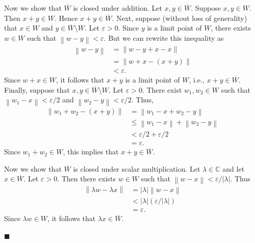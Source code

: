 \documentclass[12pt]{article}
\newcommand\norm[1]{\left\lVert#1\right\rVert}
\begin{document}
\vspace{3mm}

\noindent Now we show that $\overline{W}$ is closed under addition. Let $x,y\in\overline{W}$. Suppose $x,y\in W$. Then $x+y\in W$. Hence $x+y\in\overline{W}.$ Next, suppose (without loss of generality) that $x\in W$ and $y\in \overline{W}\setminus W$. Let $\varepsilon > 0$. Since $y$ is a limit point of $W$, there exists $w\in W$ such that $\norm{w-y}<\varepsilon$. But we can rewrite this inequality as 
\begin{align}
    \norm{w-y} &= \norm{w-y+x-x} \\
    &= \norm{w+x - (x+y)} \\
    &< \varepsilon.
\end{align}
Since $w+x\in W$, it follows that $x+y$ is a limit point of $W$, i.e., $x+y\in\overline{W}$. Finally, suppose that $x,y \in \overline{W}\setminus W$. Let $\varepsilon > 0$. There exist $w_1,w_2\in W$ such that $\norm{w_1-x}< \varepsilon/2$ and $\norm{w_2-y}<\varepsilon/2$. Thus,
\begin{align}
    \norm{w_1+w_2 - (x+y)} &= \norm{w_1 - x + w_2 - y} \\
    &\leq \norm{w_1 - x} + \norm{w_2 - y} \\
    &<\varepsilon/2 + \varepsilon/2 \\
    &= \varepsilon.
\end{align}
Since $w_1+w_2\in W$, this implies that $x+y\in\overline{W}.$

\vspace{3mm}

\noindent Now we show that $\overline{W}$ is closed under scalar multiplication. Let $\lambda\in\mathbb{C}$ and let $x\in\overline{W}$. Let $\varepsilon > 0$. Then there exists $w\in W$ such that $\norm{w-x} < \varepsilon/|\lambda|.$ Thus
\begin{align}
    \norm{\lambda w - \lambda x} &= |\lambda|\norm{w-x} \\
    &< |\lambda|\left(\varepsilon/|\lambda|\right) \\
    &= \varepsilon.
\end{align}
Since $\lambda w\in W$, it follows that $\lambda x\in\overline{W}$.

\hfill$\blacksquare$

\vfill

\begin{center}
\\
\vspace{2mm}
\vspace{-0.65cm}
\hrulefill \\
\vspace{-0.95cm}
\hrulefill
\end{center}
\end{document}
